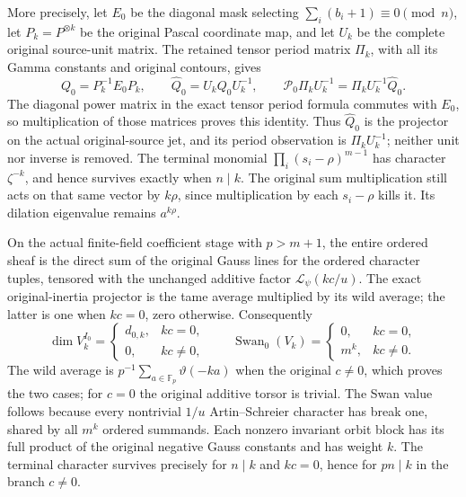 More precisely, let \(E_0\) be the diagonal mask selecting
\(\sum_i(b_i+1)\equiv0\pmod n\), let
\(P_k=P^{\otimes k}\) be the original Pascal coordinate map,
and let \(U_k\) be the complete original source-unit matrix.
The retained tensor period matrix \(\Pi_k\), with all its
Gamma constants and original contours, gives
\[
 Q_0=P_k^{-1}E_0P_k,\qquad
 \widehat Q_0=U_kQ_0U_k^{-1},\qquad
 \mathcal P_0\Pi_kU_k^{-1}
       =\Pi_kU_k^{-1}\widehat Q_0.
 \tag{SPBT.2}\label{eq:spbt2}
\]
The diagonal power matrix in the exact tensor period formula
commutes with \(E_0\), so multiplication of those matrices
proves this identity.  Thus \(\widehat Q_0\) is the projector
on the actual original-source jet, and its period observation
is \(\Pi_kU_k^{-1}\); neither unit nor inverse is removed.
The terminal monomial \(\prod_i(s_i-\rho)^{m-1}\) has
character \(\zeta^{-k}\), and hence survives exactly when
\(n\mid k\).  The original sum multiplication still acts on
that same vector by \(k\rho\), since multiplication by
each \(s_i-\rho\) kills it.  Its dilation eigenvalue remains
\(a^{k\rho}\).

On the actual finite-field coefficient stage with \(p>m+1\),
the entire ordered sheaf is the direct sum of the original
Gauss lines for the ordered character tuples, tensored with
the unchanged additive factor \(\mathcal L_\psi(kc/u)\).
The exact original-inertia projector is the tame average
multiplied by its wild average; the latter is one when
\(kc=0\), zero otherwise.  Consequently
\[
 \dim V_k^{I_0}=\begin{cases}d_{0,k},&kc=0,\\0,&kc\ne0,
 \end{cases}
 \qquad
 \operatorname{Swan}_0(V_k)=
 \begin{cases}0,&kc=0,\\m^k,&kc\ne0.\end{cases}
 \tag{SPBT.3}\label{eq:spbt3}
\]
The wild average is \(p^{-1}\sum_{a\in\mathbb F_p}
\vartheta(-ka)\) when the original \(c\ne0\), which proves
the two cases; for \(c=0\) the original additive torsor is
trivial.  The Swan value follows because every nontrivial
\(1/u\) Artin--Schreier character has break one, shared by
all \(m^k\) ordered summands.  Each nonzero invariant orbit
block has its full product of the original negative Gauss
constants and has weight \(k\).  The terminal character
survives precisely for \(n\mid k\) and \(kc=0\), hence
for \(pn\mid k\) in the branch \(c\ne0\).

